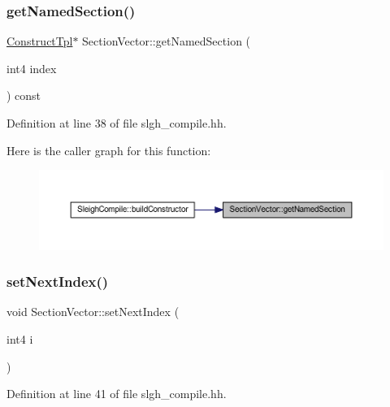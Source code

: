 \subsubsection{\texorpdfstring{getNamedSection()}{getNamedSection()}}
{\footnotesize\ttfamily \mbox{\hyperlink{class_construct_tpl}{Construct\+Tpl}}$\ast$ Section\+Vector\+::get\+Named\+Section (\begin{DoxyParamCaption}\item[{int4}]{index }\end{DoxyParamCaption}) const\hspace{0.3cm}{\ttfamily [inline]}}



Definition at line 38 of file slgh\+\_\+compile.\+hh.

Here is the caller graph for this function\+:
\nopagebreak
\begin{figure}[H]
\begin{center}
\leavevmode
\includegraphics[width=350pt]{class_section_vector_a5c581abab0689b485d9e6c567e5d606d_icgraph}
\end{center}
\end{figure}
\mbox{\label{class_section_vector_a1bffcc372bb98f06fcfabdeddd068019}} 
\subsubsection{\texorpdfstring{setNextIndex()}{setNextIndex()}}
{\footnotesize\ttfamily void Section\+Vector\+::set\+Next\+Index (\begin{DoxyParamCaption}\item[{int4}]{i }\end{DoxyParamCaption})\hspace{0.3cm}{\ttfamily [inline]}}



Definition at line 41 of file slgh\+\_\+compile.\+hh.

